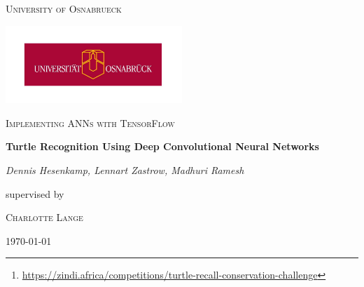 \documentclass[11pt]{article}
\begin{document}
\begin{titlepage}
	\centering
	{\scshape\LARGE University of Osnabrueck \par}
	\vspace{1cm}
	\includegraphics[width=0.5\textwidth]{images/uniOsnabruck.jpg}\par\vspace{2cm}
	\vspace{0.75cm}
	{\scshape\Large Implementing ANNs with TensorFlow\par}
	\vspace{1.5cm}
	{\huge\bfseries Turtle Recognition Using Deep Convolutional Neural Networks\par}
	\vspace{1.5cm}
	{\Large\itshape Dennis Hesenkamp, Lennart Zastrow,  Madhuri Ramesh\par}
	\vspace{1.5cm}
	supervised by\par
	\textsc{Charlotte Lange}
	\vfill

	{\large \today\par}
\end{titlepage}

\tableofcontents
\newpage

\begin{abstract}
    Sea turtles are endangered but very important for the ecosystems they live in. Being able to track and identify them is critical for modern conservation. Their unique head patterns allow for identification from photographs with neural networks. As part of a machine learning competition on the platform Zindi \footnote{\url{https://zindi.africa/competitions/turtle-recall-conservation-challenge}}, we built a convolutional neural network to identify sea turtles and investigate how different, commonly use image augmentation techniques influence the model's ability to learn the features of the turtle images. The accompanying code can be found in this repository:  \url{https://github.com/dhesenkamp/turtleRecall}
\end{abstract}













\newpage

\end{document}
